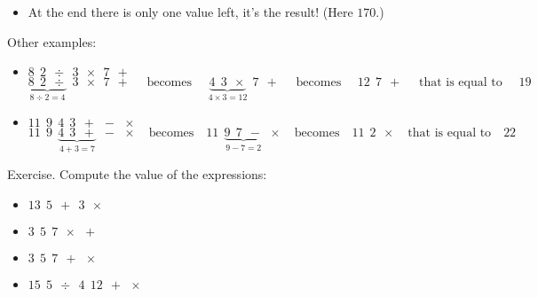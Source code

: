 \documentclass[11pt,class=report,crop=false]{standalone}
\begin{document}
\begin{cours}
\begin{itemize}
  \item At the end there is only one value left, it's the result! (Here $170$.)
\end{itemize}

\bigskip

Other examples:
\begin{itemize}
  \item $8 \ \ 2 \ \ \div \ \ 3 \ \ \times \ \ 7 \ \ +$  
$$\underbrace{8 \ \ 2 \ \ \div}_{8 \div 2 = 4} \ \ 3 \ \ \times \ \ 7 \ \ +
\quad\text{ becomes }\quad
\underbrace{4 \ \ 3 \ \ \times}_{4 \times 3 = 12} \ \ 7 \ \ + 
\quad\text{ becomes }\quad
 12 \ \ 7 \ \ +
\quad\text{ that is equal to }\quad
19$$ 
 
  \item $11 \ \ 9 \ \ 4 \ \ 3 \ \ + \ \ - \ \ \times$  
$$11 \ \ 9 \ \ \underbrace{4 \ \ 3 \ \ +}_{4+3=7} \ \ - \ \ \times
\quad\text{becomes}\quad
11 \ \ \underbrace{9 \ \ 7 \ \ -}_{9 - 7 = 2} \ \ \times 
\quad\text{becomes}\quad
11 \ \ 2 \ \ \times
\quad\text{that is equal to}\quad
22$$ 
\end{itemize}  

Exercise. Compute the value of the expressions:
\begin{itemize}
  \item $13 \ \ 5 \ \ + \ \ 3 \ \ \times$
  \item $3 \ \ 5 \ \ 7 \ \ \times \ \ +$
  \item $3 \ \ 5 \ \ 7 \ \ + \ \ \times$  
  \item $15 \ \ 5 \ \ \div \ \ 4 \ \ 12 \ \ + \ \ \times$
\end{itemize}

\end{cours}

\end{document}
